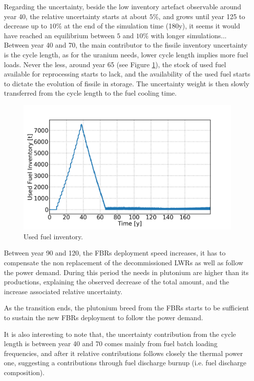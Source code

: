 \documentclass{anstrans}
\begin{document}
Regarding the uncertainty, beside the low inventory artefact observable around
year 40, the relative uncertainty starts at about $5\%$, and grows until year
125 to decrease up to $10\%$ at the end of the simulation time (180y), it seems
it would have reached an equilibrium between $5$ and $10\%$ with longer
simulations...
Between year 40 and 70, the main contributor to the fissile inventory
uncertainty is the cycle length, as for the uranium needs, lower cycle length
implies more fuel loads.  Never the less, around year 65 (see Figure
\ref{fig:used_fuel}), the stock of used fuel available for reprocessing starts
to lack, and the availability of the used fuel starts to dictate the evolution
of fissile in storage.  The uncertainty weight is then slowly transferred from
the cycle length to the fuel cooling time.

\begin{figure}[ht] %
    \centering
    \includegraphics[scale=0.18]{used_fuel}
    \caption{Used fuel inventory.}\label{fig:used_fuel}
\end{figure}
Between year 90 and 120, the \glspl{FBR} deployment speed increases, it has to
compensate the non replacement of the decommissioned \glspl{LWR} as well as
follow the power demand.  During this period the needs in plutonium are higher
than its productions, explaining the observed decrease of the total amount, and
the increase associated relative uncertainty.

As the transition ends, the plutonium breed from the \glspl{FBR} starts to be
sufficient to sustain the new \glspl{FBR} deployment to follow the power demand.

It is also interesting to note that, the uncertainty contribution from the cycle
length is between year 40 and 70 comes mainly from fuel batch loading
frequencies, and after it relative contributions follows closely the thermal
power one, suggesting a contributions through fuel discharge burnup (i.e. fuel
discharge composition).
\end{document}
